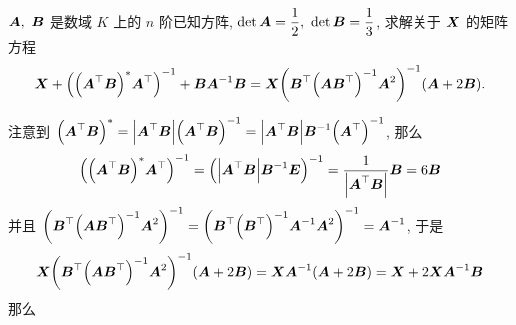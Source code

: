 \begin{example}
    $\vb*{A},~\vb*{B}$ 是数域 $K$ 上的 $n$ 阶已知方阵, $\det \vb*{A}=\dfrac{1}{2},~\det\vb*{B}=\dfrac{1}{3}$, 求解关于 $\vb*{X}$ 的矩阵方程
    $$\vb*{X}+\qty(\qty(\vb*{A}^\top\vb*{B})^*\vb*{A}^\top)^{-1}+\vb*{BA}^{-1}\vb*{B}=\vb*{X}\qty(\vb*{B}^\top\qty(\vb*{AB}^\top)^{-1}\vb*{A}^2)^{-1}(\vb*{A}+2\vb*{B}).$$
\end{example}
\begin{solution}
    注意到 $\qty(\vb*{A}^\top\vb*{B})^*=\qty|\vb*{A}^\top\vb*{B}|\qty(\vb*{A}^\top\vb*{B})^{-1}=\qty|\vb*{A}^\top\vb*{B}|\vb*{B}^{-1}\qty(\vb*{A}^\top)^{-1}$, 
    那么 $$\qty(\qty(\vb*{A}^\top\vb*{B})^*\vb*{A}^\top)^{-1}=\qty(\qty|\vb*{A}^\top\vb*{B}|\vb*{B}^{-1}\vb*{E})^{-1}=\dfrac{1}{\qty|\vb*{A}^\top\vb*{B}|}\vb*{B}=6\vb*{B}$$
    并且 $\qty(\vb*{B}^\top\qty(\vb*{AB}^\top)^{-1}\vb*{A}^2)^{-1}=\qty(\vb*{B}^\top\qty(\vb*{B}^\top)^{-1}\vb*{A}^{-1}\vb*{A}^2)^{-1}=\vb*{A}^{-1}$, 于是
    $$\vb*{X}\qty(\vb*{B}^\top\qty(\vb*{AB}^\top)^{-1}\vb*{A}^2)^{-1}(\vb*{A}+2\vb*{B})=\vb*{X}\vb*{A}^{-1}\qty(\vb*{A}+2\vb*{B})=\vb*{X}+2\vb*{XA}^{-1}\vb*{B}$$
    那么 
\end{solution}

